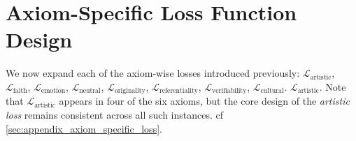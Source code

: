 \begin{comment}
\begin{multline*}
\mathcal{L}_{\text{CAO}} 
= \omega \left(f_{\text{faith\_artistic}}(I) + \tau_1 \, W\bigl(P_{\text{faith}},Q_{\text{artistic}}\bigr)\right) \\
+ \beta \left(f_{\text{emotion\_neutrality}}(I) + \tau_2 \, W\bigl(P_{\text{emotion}},Q_{\text{neutrality}}\bigr)\right) \\
+ \gamma \left(f_{\text{visual\_style}}(I) + \tau_3 \, W\bigl(P_{\text{visual}},Q_{\text{style}}\bigr)\right) \\
+ \delta \left(f_{\text{originality\_referentiality}}(I) + \tau_4 \, W\bigl(P_{\text{originality}},Q_{\text{referentiality}}\bigr)\right) \\
+ \eta \left(f_{\text{verifiability\_creative}}(I) + \tau_5 \, W\bigl(P_{\text{verifiability}},Q_{\text{creative}}\bigr)\right) \\
+ \theta \left(f_{\text{cultural\_artistic}}(I) + \tau_6 \, W\bigl(P_{\text{cultural}},Q_{\text{artistic}}\bigr)\right).
\end{multline*}
\end{comment}




























\section{Axiom-Specific Loss Function Design}
\label{sec:axiom_loss}

We now expand each of the axiom-wise losses introduced previously: $\mathcal{L}_{\text{artistic}}$, $\mathcal{L}_{\text{faith}}$, $\mathcal{L}_{\text{emotion}}$, $\mathcal{L}_{\text{neutral}}$, $\mathcal{L}_{\text{originality}}$, $\mathcal{L}_{\text{referentiality}}$, $\mathcal{L}_{\text{verifiability}}$,  $\mathcal{L}_{\text{cultural}}$. $\mathcal{L}_{\text{artistic}}$. Note that \(\mathcal{L}_{\text{artistic}}\) appears in four of the six axioms, but the core design of the \emph{artistic loss} remains consistent across all such instances. cf \cref{sec:appendix_axiom_specific_loss}. 



